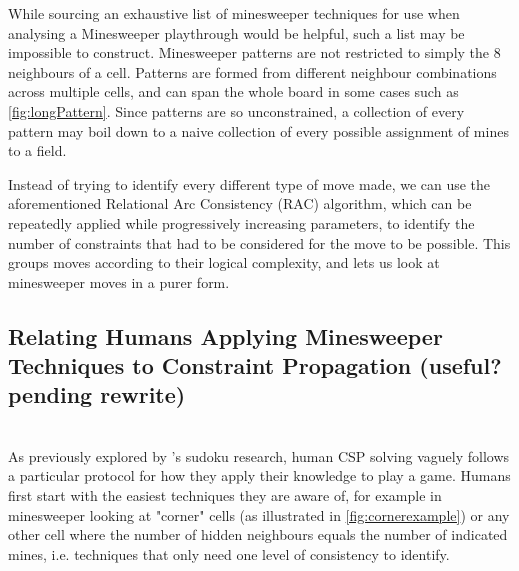 While sourcing an exhaustive list of minesweeper techniques for use when analysing a Minesweeper playthrough would be helpful, such a list may be impossible to construct.
Minesweeper patterns are not restricted to simply the 8 neighbours of a cell. Patterns are formed from different neighbour combinations across multiple cells, and can span the whole board in some cases such as \ref{fig:longPattern}. Since patterns are so unconstrained, a collection of every pattern may boil down to a naive collection of every possible assignment of mines to a field.

Instead of trying to identify every different type of move made, we can use the aforementioned Relational Arc Consistency (RAC) algorithm, which can be repeatedly applied while progressively increasing parameters, to identify the number of constraints that had to be considered for the move to be possible. This groups moves according to their logical complexity, and lets us look at minesweeper moves in a purer form.
\todoOr{$\uparrow\uparrow\uparrow\uparrow\uparrow\uparrow\uparrow\uparrow\uparrow\uparrow\uparrow$}

\subsection{Relating Humans Applying Minesweeper Techniques to Constraint Propagation (useful? pending rewrite)} \label{awa:theHumanPlayingPipeline}

 \\
As previously explored by \citet{sudokuComputationalModel}'s sudoku research, human CSP solving vaguely follows a particular protocol for how they apply their knowledge to play a game. Humans first start with the easiest techniques they are aware of, for example in minesweeper looking at "corner" cells (as illustrated in \cref{fig:cornerexample}) or any other cell where the number of hidden neighbours equals the number of indicated mines, i.e. techniques that only need one level of consistency to identify.


